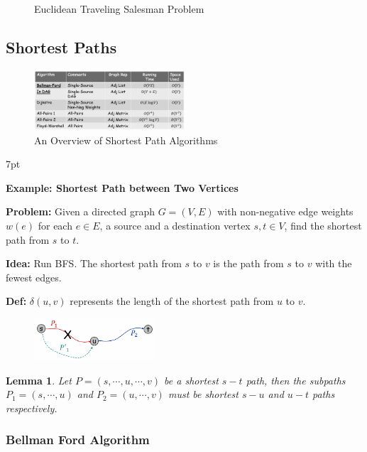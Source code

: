 \documentclass[10pt]{article}
\newtheorem*{lemma}{Lemma}
\newenvironment{formal}[2]{%
	\def\FrameCommand{%
		\hspace{1pt}%
		{\color{#1}\vrule width 2pt}%
		{\color{#2}\vrule width 4pt}%
		\colorbox{#2}%
	}%
	\MakeFramed{\advance\hsize-\width\FrameRestore}%
	\noindent\hspace{-4.55pt}%
	\begin{adjustwidth}{}{7pt}%
		\vspace{2pt}\vspace{2pt}%
	}
	{%
		\vspace{2pt}\end{adjustwidth}\endMakeFramed%
}
\begin{document}
\begin{figure}[h]
\begin{subfigure}[b]{0.3\textwidth}
	\end{subfigure}
	\caption*{Euclidean Traveling Salesman Problem}
\end{figure}

\subsection{Shortest Paths}

\begin{figure}[h]
	\centering
	\includegraphics[width=0.5\textwidth]{img7-6}
	\caption*{An Overview of Shortest Path Algorithms}
\end{figure}
\begin{formal}{Brown}{brownshade}

	\textbf{Example: Shortest Path between Two Vertices}

	\textbf{Problem:} Given a directed graph $G = (V, E)$ with non-negative edge weights $w(e)$ for each $e \in E$, a source and a destination vertex $s,t \in V$, find the shortest path from $s$ to $t$.

	\textbf{Idea:} Run BFS. The shortest path from $s$ to $v$ is the path from $s$ to $v$ with the fewest edges.

	\textbf{Def:} $\delta(u, v)$ represents the length of the shortest path from $u$ to $v$.

\end{formal}

\begin{figure}[h]
	\centering
	\includegraphics[width=0.4\textwidth]{img7-7}
\end{figure}
\begin{lemma}
	Let $P=(s, \cdots, u, \cdots, v)$ be a shortest $s-t$ path, then the subpaths $P_1 = (s, \cdots, u)$ and $P_2 = (u, \cdots, v)$ must be shortest $s-u$ and $u-t$ paths respectively.
\end{lemma}

\subsubsection{Bellman Ford Algorithm}
\end{document}
